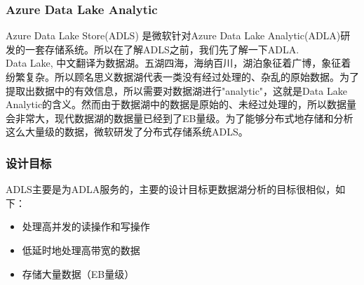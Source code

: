 \documentclass[11pt]{article}
\begin{document}
\subsubsection{Azure Data Lake Analytic}
Azure Data Lake Store(ADLS) 是微软针对Azure Data Lake Analytic(ADLA)研发的一套存储系统。所以在了解ADLS之前，我们先了解一下ADLA.\\
Data Lake, 中文翻译为数据湖。五湖四海，海纳百川，湖泊象征着广博，象征着纷繁复杂。所以顾名思义数据湖代表一类没有经过处理的、杂乱的原始数据。为了提取出数据中的有效信息，所以需要对数据湖进行"analytic"，这就是Data Lake Analytic的含义。然而由于数据湖中的数据是原始的、未经过处理的，所以数据量会非常大，现代数据湖的数据量已经到了EB量级。为了能够分布式地存储和分析这么大量级的数据，微软研发了分布式存储系统ADLS。
\subsubsection{设计目标}
ADLS主要是为ADLA服务的，主要的设计目标更数据湖分析的目标很相似，如下：
\begin{itemize}
	\item 处理高并发的读操作和写操作
	\item 低延时地处理高带宽的数据
	\item 存储大量数据（EB量级）
\end{itemize}
\end{document}
